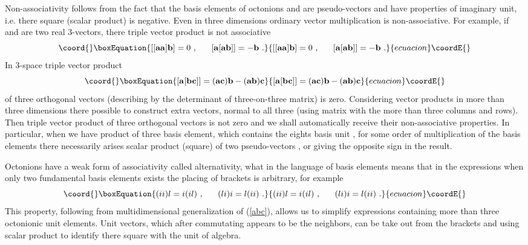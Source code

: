 \documentclass[a4paper,12pt]{article}
\begin{document}
Non-associativity follows from the fact that the basis elements of octonions \coordHE{} 
and \coordHE{} are pseudo-vectors and have properties of imaginary unit, i.e. there square 
(scalar product) is negative. Even in three dimensions ordinary vector multiplication is 
non-associative. For example, if \coordHE{} and \coordHE{} are two real 3-vectors, there 
triple vector product is not associative 
\begin{equation}\coord{}\boxEquation{ \label{non-ass}
[[{\bf aa}]{\bf b}] = 0 ~, ~~~~~ [{\bf a}[{\bf ab}]]=-{\bf b} ~.
}{ [[{\bf aa}]{\bf b}] = 0 ~, ~~~~~ [{\bf a}[{\bf ab}]]=-{\bf b} ~.
}{ecuacion}\coordE{}\end{equation}
In 3-space triple vector product 
\begin{equation}\coord{}\boxEquation{ \label{abc}
[{\bf a}[{\bf bc}]] = ({\bf ac}){\bf b} - ({\bf ab}){\bf c}
}{ [{\bf a}[{\bf bc}]] = ({\bf ac}){\bf b} - ({\bf ab}){\bf c}
}{ecuacion}\coordE{}\end{equation}
of three orthogonal vectors (describing by the determinant of three-on-three matrix) is 
zero. Considering vector products in more than three dimensions there possible to 
construct extra vectors, normal to all three (using matrix with the more than three 
columns and rows). Then triple vector product of three orthogonal vectors is not zero 
and we shall automatically receive their non-associative properties. In particular, when 
we have product of three basis element, which contains the eights basis unit \coordHE{}, 
for some order of multiplication of the basis elements there necessarily arises scalar 
product (square) of two pseudo-vectors \coordHE{}, or \coordHE{} giving the opposite sign 
in the result. 

Octonions have a weak form of associativity called alternativity, what in the language 
of basis elements means that in the expressions when only two fundamental basis elements 
exists the placing of brackets is arbitrary, for example 
\begin{equation}\coord{}\boxEquation{ \label{ii}
(ii)l = i(il)~, ~~~~~ (li)i = l(ii) ~.
}{ (ii)l = i(il)~, ~~~~~ (li)i = l(ii) ~.
}{ecuacion}\coordE{}\end{equation}
This property, following from multidimensional generalization of (\ref{abc}), allows us 
to simplify expressions containing more than three octonionic unit elements. Unit 
vectors, which after commutating appears to be the neighbors, can be take out from the 
brackets and using scalar product to identify there square with the unit of algebra. 
\end{document}
